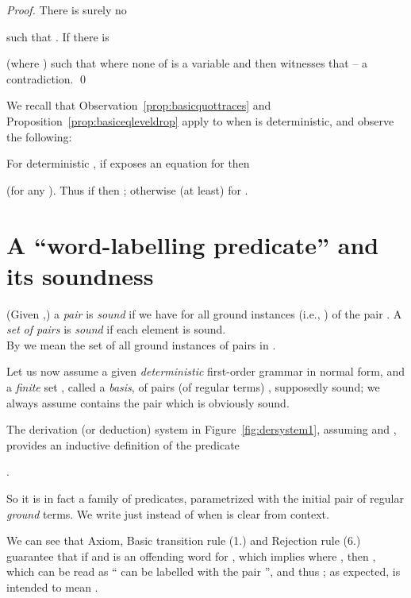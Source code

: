 \documentclass[12pt]{article}
\begin{document}
\begin{proof}
There is surely no 

such that . If there is 
 
(where )
such that 
 where none of  is a variable and
 then 
 witnesses that
 -- a
contradiction.
\qed
\end{proof}


\noindent
We recall that Observation~\ref{prop:basicquottraces} 
and Proposition~\ref{prop:basiceqleveldrop} apply
to   when 
 is deterministic, and observe the following:

\begin{observ}
For deterministic , 
if  exposes an equation  for 
 then 

(for any ). 
Thus if  then
; 
otherwise (at least)
 for 
.
\end{observ}




\section{A ``word-labelling predicate''  and its soundness}\label{subsec:dersystem}

\begin{defn}
(Given ,)
a \emph{pair}
 is \emph{sound} if we
have   
for all ground instances 
 (i.e., ) 
of the pair .
A \emph{set}  \emph{of pairs}  is \emph{sound} if each
element is sound. 
\\
By  we mean the set of all
ground instances of pairs in .
\end{defn}
Let us now assume a given \emph{deterministic}
first-order grammar 
  in normal form, and
a \emph{finite} set , called
a \emph{basis}, 
of pairs (of regular terms) , supposedly sound;
we 
always 
assume  contains the pair 
which is obviously sound.


The derivation (or deduction) system in
Figure~\ref{fig:dersystem1}, assuming  and ,
provides
an inductive definition of the predicate 
\begin{center}
.
\end{center}
So it is in fact a family of predicates, parametrized with the initial
pair  of regular \emph{ground} terms. We write just
\modr{} instead of 
 when  is  clear from context. 


We can see that Axiom,
Basic transition rule (1.) and Rejection rule (6.) guarantee that 
if  and  is an offending word for 
, which implies  where ,
then  , which can be read as `` can be labelled
with the pair '', and thus ; as
expected, 
  is intended to mean .
 
\end{document}
